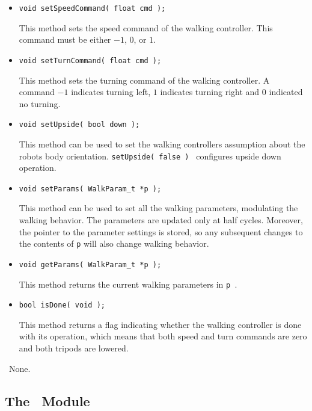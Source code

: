 \localinterface

\begin{itemize}
\item{\tt void setSpeedCommand( float cmd ); } \par
This method sets the speed command of the walking controller. This
command must be either $-1$, $0$, or $1$.
\item{\tt void setTurnCommand( float cmd ); } \par
This method sets the turning command of the walking controller. A
command $-1$ indicates turning left, $1$ indicates turning right and $0$
indicated no turning.
\item{\tt void setUpside( bool down ); } \par
This method can be used to set the walking controllers assumption
about the robots body orientation. {\tt setUpside( false ) } configures
upside down operation.
\item{\tt void setParams( WalkParam\_t *p ); } \par
This method can be used to set all the walking parameters, modulating
the walking behavior. The parameters are updated only at
half cycles. Moreover, the pointer to the parameter settings is stored,
so any subsequent changes to the contents of {\tt *p} will also change
walking behavior.
\item{\tt void getParams( WalkParam\_t *p ); } \par
This method returns the current walking parameters in {\tt *p }. 
\item{\tt bool isDone( void ); } \par
This method returns a flag indicating whether the walking controller
is done with its operation, which means that both speed and turn
commands are zero and both tripods are lowered.
\end{itemize}

\configsymbols\ None.

\subsection{The \RHexWalker\ Module}
\label{sec:rhexwalker}

\begin{moduleheader}
\classname{\RHexWalker} \mline
\modulebase{\Module} \mline
{} \mline
{}
\end{moduleheader}

